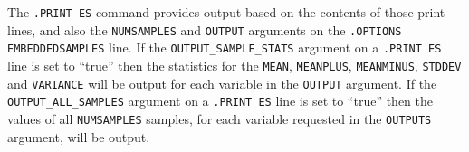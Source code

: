 \begin{Command}
The \texttt{.PRINT ES} command provides output based on the contents
of those print-lines, and also the \texttt{NUMSAMPLES} and \texttt{OUTPUT}
arguments on the \texttt{.OPTIONS EMBEDDEDSAMPLES} line. If the
\texttt{OUTPUT\_SAMPLE\_STATS} argument on a \texttt{.PRINT ES} line is
set to ``true'' then the statistics for the \texttt{MEAN}, \texttt{MEANPLUS},
\texttt{MEANMINUS}, \texttt{STDDEV} and \texttt{VARIANCE} will be output for each
variable in the \texttt{OUTPUT} argument.  If the \texttt{OUTPUT\_ALL\_SAMPLES}
argument on a \texttt{.PRINT ES} line is set to ``true'' then the values
of all \texttt{NUMSAMPLES} samples, for each variable requested
in the \texttt{OUTPUTS} argument, will be output.

\end{Command}


